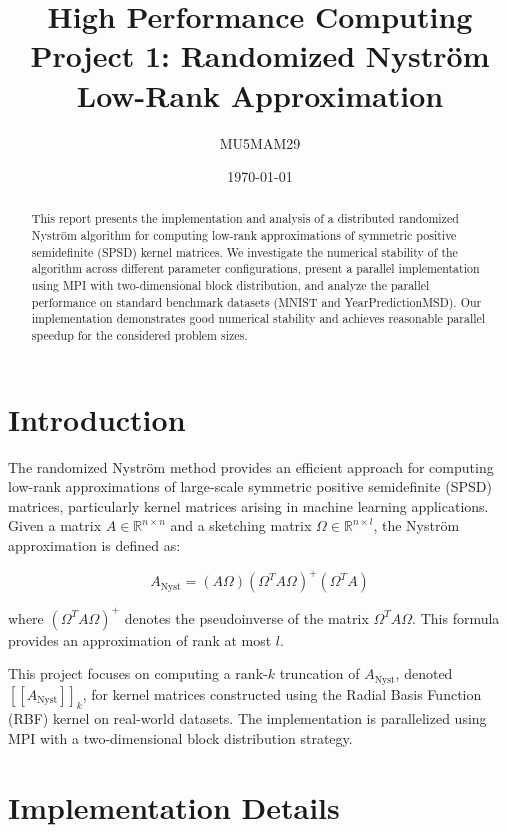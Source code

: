 \documentclass[11pt,a4paper]{article}
\title{\textbf{High Performance Computing} \\
       \Large Project 1: Randomized Nyström Low-Rank Approximation}
\author{MU5MAM29}
\date{\today}
\begin{document}
\maketitle

\begin{abstract}
This report presents the implementation and analysis of a distributed randomized Nyström algorithm for computing low-rank approximations of symmetric positive semidefinite (SPSD) kernel matrices. We investigate the numerical stability of the algorithm across different parameter configurations, present a parallel implementation using MPI with two-dimensional block distribution, and analyze the parallel performance on standard benchmark datasets (MNIST and YearPredictionMSD). Our implementation demonstrates good numerical stability and achieves reasonable parallel speedup for the considered problem sizes.
\end{abstract}

\tableofcontents
\newpage

\section{Introduction}

The randomized Nyström method provides an efficient approach for computing low-rank approximations of large-scale symmetric positive semidefinite (SPSD) matrices, particularly kernel matrices arising in machine learning applications. Given a matrix $A \in \mathbb{R}^{n \times n}$ and a sketching matrix $\Omega \in \mathbb{R}^{n \times l}$, the Nyström approximation is defined as:

\begin{equation}
A_{\text{Nyst}} = (A\Omega)(\Omega^T A\Omega)^+(\Omega^T A)
\label{eq:nystrom}
\end{equation}

where $(\Omega^T A\Omega)^+$ denotes the pseudoinverse of the matrix $\Omega^T A\Omega$. This formula provides an approximation of rank at most $l$.

This project focuses on computing a rank-$k$ truncation of $A_{\text{Nyst}}$, denoted $[[A_{\text{Nyst}}]]_k$, for kernel matrices constructed using the Radial Basis Function (RBF) kernel on real-world datasets. The implementation is parallelized using MPI with a two-dimensional block distribution strategy.

\section{Implementation Details}
\end{document}
